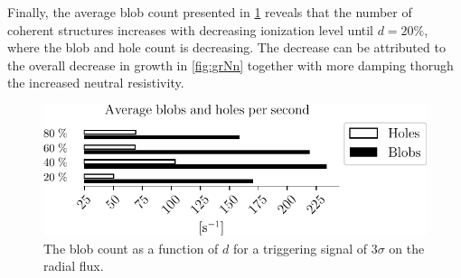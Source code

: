 Finally, the average blob count presented in \cref{fig:nnScanBlobCount} reveals that the number of coherent structures increases with decreasing ionization level until $d=20\%$, where the blob and hole count is decreasing.
The decrease can be attributed to the overall decrease in growth in \cref{fig:grNn} together with more damping thorugh the increased neutral resistivity.
%
\begin{figure}[htb]
    \centering
    \includegraphics{fig/results/neutral/nnScanBlobCount}
    \caption{The blob count as a function of $d$ for a triggering signal of $3\sigma$ on the radial flux.}
    \label{fig:nnScanBlobCount}
\end{figure}
%
